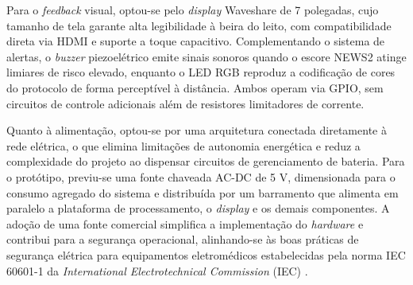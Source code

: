Para o \textit{feedback} visual, optou-se pelo \textit{display} Waveshare de 7 polegadas, cujo tamanho de tela garante alta legibilidade à beira do leito, com compatibilidade direta via HDMI e suporte a toque capacitivo. Complementando o sistema de alertas, o \textit{buzzer} piezoelétrico emite sinais sonoros quando o escore NEWS2 atinge limiares de risco elevado, enquanto o LED RGB reproduz a codificação de cores do protocolo de forma perceptível à distância. Ambos operam via GPIO, sem circuitos de controle adicionais além de resistores limitadores de corrente.



Quanto à alimentação, optou-se por uma arquitetura conectada diretamente à rede elétrica, o que elimina limitações de autonomia energética e reduz a complexidade do projeto ao dispensar circuitos de gerenciamento de bateria. Para o protótipo, previu-se uma fonte chaveada AC-DC de 5 V, dimensionada para o consumo agregado do sistema e distribuída por um barramento que alimenta em paralelo a plataforma de processamento, o \textit{display} e os demais componentes. A adoção de uma fonte comercial simplifica a implementação do \textit{hardware} e contribui para a segurança operacional, alinhando-se às boas práticas de segurança elétrica para equipamentos eletromédicos estabelecidas pela norma IEC 60601-1 da \textit{International Electrotechnical Commission} (IEC) .


